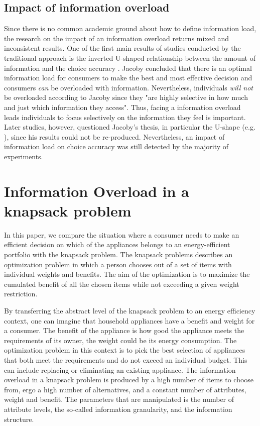 \subsection{Impact of information overload}

Since there is no common academic ground about how to define information load, the research on the impact of an information overload returns mixed and inconsistent results.
One of the first main results of studies conducted by the traditional approach is the inverted U-shaped relationship between the amount of information and the choice accuracy \citep{Jacoby1974}. Jacoby concluded that there is an optimal information load for consumers to make the best and most effective decision and consumers \textit{can} be overloaded with information. Nevertheless, individuals \textit{will not} be overloaded according to Jacoby since they "are highly selective in how much and just which information they access". Thus, facing a information overload leads individuals to focus selectively on the information they feel is important.
Later studies, however, questioned Jacoby's thesis, in particular the U-shape (e.g. \cite{Malhotra1982}), since his results could not be re-produced. Nevertheless, an impact of information load on choice accuracy was still detected by the majority of experiments.

\section{Information Overload in a knapsack problem}
\label{ch:Literature Review:sec:Information Overload in a knapsack problem}
In this paper, we compare the situation where a consumer needs to make an efficient decision on which of the appliances belongs to an energy-efficient portfolio with the knapsack problem. The knapsack problems describes an optimization problem in which a person chooses out of a set of items with individual weights and benefits. The aim of the optimization is to maximize the cumulated benefit of all the chosen items while not exceeding a given weight restriction.

By transferring the abstract level of the knapsack problem to an energy efficiency context, one can imagine that household appliances have a benefit and weight for a consumer. The benefit of the appliance is how good the appliance meets the requirements of its owner, the weight could be its energy consumption. The optimization problem in this context is to pick the best selection of appliances that both meet the requirements and do not exceed an individual budget. This can include replacing or eliminating an existing appliance.
The information overload in a knapsack problem is produced by a high number of items to choose from, ergo a high number of alternatives, and a constant number of attributes, weight and benefit. The parameters that are manipulated is the number of attribute levels, the so-called information granularity, and the information structure.

